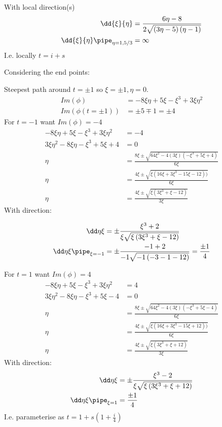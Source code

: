 \documentclass{X:/Documents/Coding/Latex/myassignment}
\begin{document}
\begin{enumerate}
	With local direction(s)
	\begin{align*}
		\dd{\xi}{\eta} &= \frac{6\eta-8}{2\sqrt{\left(3\eta-5\right)\left(\eta-1\right)}}\\
		\dd{\xi}{\eta}\pipe_{\eta = 1,5/3} &= \infty
	\end{align*}
	I.e. locally $t= i+s$

	Considering the end points:

	Steepest path around $t=\pm1$ so $\xi = \pm1, \eta = 0$.
	\begin{align*}
		Im(\phi) &=-8\xi\eta + 5\xi - \xi^3 + 3\xi\eta^2\\
		Im(\phi(t=\pm1))&=\pm5 \mp1 = \pm4
	\end{align*}
	For $t=-1$ want $Im(\phi) = -4$
	\begin{align*}
		-8\xi\eta + 5\xi - \xi^3 + 3\xi\eta^2 &= -4\\
		3\xi\eta^2 - 8\xi\eta -\xi^3 + 5\xi +4 &=0\\
		\eta &= \frac{8\xi \pm \sqrt{64\xi^2 - 4(3\xi)(-\xi^3 + 5\xi +4)}}{6\xi}\\
		\eta &= \frac{4\xi \pm \sqrt{\xi(16\xi +3\xi^3 - 15\xi -12))}}{6\xi}\\
		\eta &= \frac{4\xi \pm \sqrt{\xi(3\xi^3 + \xi -12)}}{3\xi}
	\end{align*}
	With direction:

	\begin{align*}
		\dd\eta\xi &= \pm\frac{\xi ^3+2}{\xi \sqrt{\xi \left(3\xi ^3+\xi -12\right)}}\\
		\dd\eta\xi\pipe_{\xi=-1} &= \pm\frac{-1+2}{-1\sqrt{-1\left(-3-1 -12\right)}} = \frac{\pm 1}{4}\\
	\end{align*}

	For $t=1$ want $Im(\phi) = 4$
	\begin{align*}
		-8\xi\eta + 5\xi - \xi^3 + 3\xi\eta^2 &= 4\\
		3\xi\eta^2 - 8\xi\eta -\xi^3 + 5\xi -4 &=0\\
		\eta &= \frac{8\xi \pm \sqrt{64\xi^2 - 4(3\xi)(-\xi^3 + 5\xi -4)}}{6\xi}\\
		\eta &= \frac{4\xi \pm \sqrt{\xi(16\xi +3\xi^3 - 15\xi +12))}}{6\xi}\\
		\eta &= \frac{4\xi \pm \sqrt{\xi(3\xi^3 + \xi +12)}}{3\xi}
	\end{align*}
	With direction:
	\begin{align*}
		\dd\eta\xi &= \pm\frac{\xi ^3-2}{\xi \sqrt{\xi \left(3\xi ^3+\xi +12\right)}}\\
		\dd\eta\xi\pipe_{\xi=1} &= \frac{\pm 1}{4}\\
	\end{align*}
	I.e. parameterise as $t =1 + s(1+\frac{i}4)$




\end{enumerate}
\end{document}
